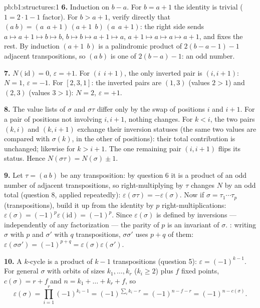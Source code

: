 \begin{solution}{pb:b1:structures:1}
\textbf{6.} Induction on $b - a$. For $b = a + 1$ the identity is
trivial ($1 = 2\cdot1 - 1$ factor). For $b > a + 1$, verify
directly that $(a\ b) = (a\ \ a{+}1)\,(a{+}1\ \ b)\,(a\ \ a{+}1)$:
the right side sends $a \mapsto a{+}1 \mapsto b \mapsto b$, $b
\mapsto b \mapsto a{+}1 \mapsto a$, $a{+}1 \mapsto a \mapsto a
\mapsto a{+}1$, and fixes the rest. By induction $(a{+}1\ \ b)$ is
a palindromic product of $2(b - a - 1) - 1$ adjacent
transpositions, so $(a\ b)$ is one of $2(b - a) - 1$: an odd
number.

\textbf{7.} $N(\mathrm{id}) = 0$, $\varepsilon = +1$. For $(i\ \
i{+}1)$, the only inverted pair is $(i, i+1)$: $N = 1$,
$\varepsilon = -1$. For $[2, 3, 1]$: the inverted pairs are $(1,
3)$ (values $2 > 1$) and $(2, 3)$ (values $3 > 1$): $N = 2$,
$\varepsilon = +1$.

\textbf{8.} The value lists of $\sigma$ and $\sigma\tau$ differ
only by the swap of positions $i$ and $i + 1$. For a pair of
positions not involving $i, i+1$, nothing changes. For $k < i$,
the two pairs $(k, i)$ and $(k, i+1)$ exchange their inversion
statuses (the same two values are compared with $\sigma(k)$, in
the other  of positions): their total contribution is
unchanged; likewise for $k > i + 1$. The one remaining pair $(i,
i+1)$ flips its status. Hence $N(\sigma\tau) = N(\sigma) \pm 1$.

\textbf{9.} Let $\tau = (a\ b)$ be any transposition: by
question 6 it is a product of an odd number of adjacent
transpositions, so right-multiplying by $\tau$ changes $N$ by an
odd total (question 8, applied repeatedly): $\varepsilon(\sigma
\tau) = -\varepsilon(\sigma)$. Now if $\sigma = \tau_1\cdots
\tau_p$ (transpositions), build it up from the identity by $p$
right-multiplications: $\varepsilon(\sigma) =
(-1)^p\varepsilon(\mathrm{id}) = (-1)^p$. Since
$\varepsilon(\sigma)$ is defined by inversions --- independently
of any factorization --- the parity of $p$ is an invariant of
$\sigma$. : writing $\sigma$ with $p$ and $\sigma'$ with
$q$ transpositions, $\sigma\sigma'$ uses $p + q$ of them:
$\varepsilon(\sigma\sigma') = (-1)^{p+q} =
\varepsilon(\sigma)\varepsilon(\sigma')$.

\textbf{10.} A $k$-cycle is a product of $k - 1$ transpositions
(question 5): $\varepsilon = (-1)^{k-1}$. For general $\sigma$
with orbits of sizes $k_1, \dots, k_r$ ($k_i \geq 2$) plus $f$
fixed points, $c(\sigma) = r + f$ and $n = k_1 + \dots + k_r + f$,
so
\[
\varepsilon(\sigma) = \prod_{i=1}^r (-1)^{k_i - 1}
= (-1)^{\sum_i k_i - r} = (-1)^{n - f - r} = (-1)^{n -
c(\sigma)} .
\]


\end{solution}
